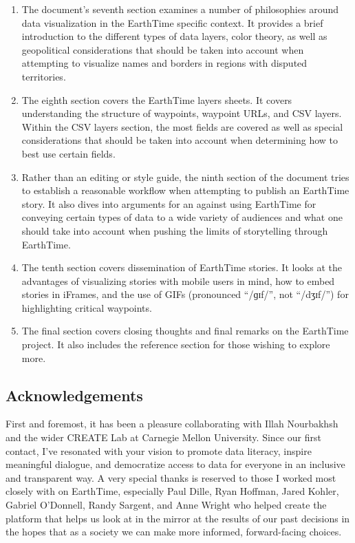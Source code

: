 \documentclass[
  12pt,
]{krantz}
\begin{document}
\begin{enumerate}
\item
  The document's seventh section examines a number of philosophies around data visualization in the EarthTime specific context. It provides a brief introduction to the different types of data layers, color theory, as well as geopolitical considerations that should be taken into account when attempting to visualize names and borders in regions with disputed territories.
\item
  The eighth section covers the EarthTime layers sheets. It covers understanding the structure of waypoints, waypoint URLs, and CSV layers. Within the CSV layers section, the most fields are covered as well as special considerations that should be taken into account when determining how to best use certain fields.
\item
  Rather than an editing or style guide, the ninth section of the document tries to establish a reasonable workflow when attempting to publish an EarthTime story. It also dives into arguments for an against using EarthTime for conveying certain types of data to a wide variety of audiences and what one should take into account when pushing the limits of storytelling through EarthTime.
\item
  The tenth section covers dissemination of EarthTime stories. It looks at the advantages of visualizing stories with mobile users in mind, how to embed stories in iFrames, and the use of GIFs (pronounced ``/ɡɪf/'', not ``/dʒɪf/'') for highlighting critical waypoints.
\item
  The final section covers closing thoughts and final remarks on the EarthTime project. It also includes the reference section for those wishing to explore more.
\end{enumerate}

\hypertarget{acknowledgements}{%
\subsection*{Acknowledgements}\label{acknowledgements}}


First and foremost, it has been a pleasure collaborating with Illah Nourbakhsh and the wider CREATE Lab at Carnegie Mellon University. Since our first contact, I've resonated with your vision to promote data literacy, inspire meaningful dialogue, and democratize access to data for everyone in an inclusive and transparent way. A very special thanks is reserved to those I worked most closely with on EarthTime, especially Paul Dille, Ryan Hoffman, Jared Kohler, Gabriel O'Donnell, Randy Sargent, and Anne Wright who helped create the platform that helps us look at in the mirror at the results of our past decisions in the hopes that as a society we can make more informed, forward-facing choices.
\end{document}
